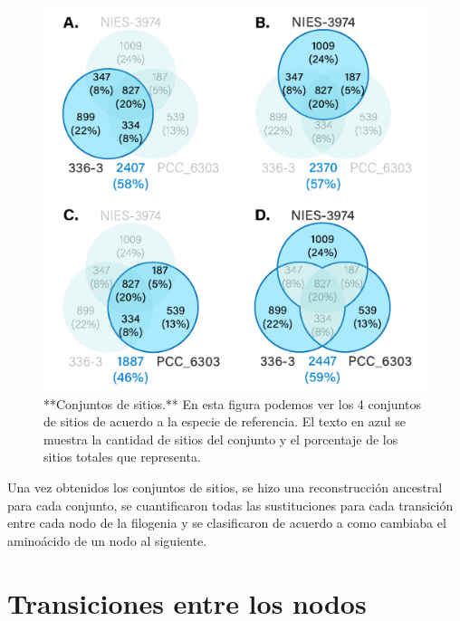 \documentclass[
]{book}
\begin{document}
\begin{figure}

{\centering \includegraphics[width=1\linewidth]{Clados/Calothrix_B/figures/All_venn_calothrix} 

}

\caption{**Conjuntos de sitios.** En esta figura podemos ver los 4 conjuntos de sitios de acuerdo a la especie de referencia. El texto en azul se muestra la cantidad de sitios del conjunto y el porcentaje de los sitios totales que representa.}\label{fig:FIG3}
\end{figure}

Una vez obtenidos los conjuntos de sitios, se hizo una reconstrucción ancestral para cada conjunto, se cuantificaron todas las sustituciones para cada transición entre cada nodo de la filogenia y se clasificaron de acuerdo a como cambiaba el aminoácido de un nodo al siguiente.

\hypertarget{transiciones-entre-los-nodos}{%
\section{Transiciones entre los nodos}\label{transiciones-entre-los-nodos}}
\end{document}
